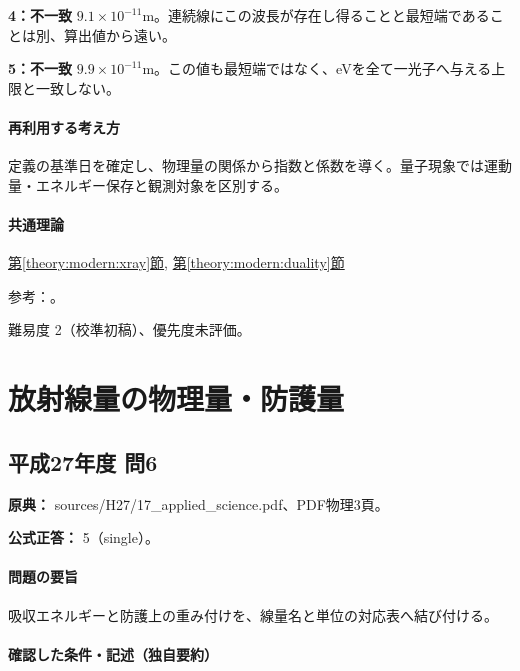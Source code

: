 \noindent\textbf{4：不一致} \(9.1\times10^{-11}\mathrm{m}\)。連続線にこの波長が存在し得ることと最短端であることは別、算出値から遠い。\par

\noindent\textbf{5：不一致} \(9.9\times10^{-11}\mathrm{m}\)。この値も最短端ではなく、eVを全て一光子へ与える上限と一致しない。\par

\paragraph{再利用する考え方} 定義の基準日を確定し、物理量の関係から指数と係数を導く。量子現象では運動量・エネルギー保存と観測対象を区別する。

\paragraph{共通理論} \hyperref[theory:modern:xray]{第\ref*{theory:modern:xray}節}, \hyperref[theory:modern:duality]{第\ref*{theory:modern:duality}節}

\par 参考：\cite{os_photoelectric}。

\par 難易度 2（校準初稿）、優先度未評価。

\section{放射線量の物理量・防護量}

\subsection{平成27年度 問6}
\label{q:h27-reg-applied-06}

\noindent\textbf{原典：} sources/H27/17\_applied\_science.pdf、PDF物理3頁。

\textbf{公式正答：} 5（single）。

\paragraph{問題の要旨} 吸収エネルギーと防護上の重み付けを、線量名と単位の対応表へ結び付ける。

\paragraph{確認した条件・記述（独自要約）}\mbox{}\par

